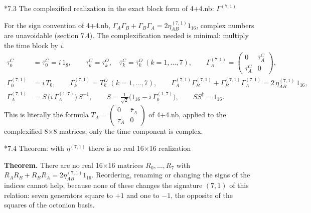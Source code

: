 \documentclass[10pt,a4paper]{article}
\makeatletter
\renewcommand\subsection{\@startsection{subsection}{2}{\z@}{-3.25ex\@plus -1ex \@minus -.2ex}{1.5ex \@plus .2ex}{\normalfont\large\bfseries\raggedright}}
\makeatother
\begin{document}
\subsection*{7.3 The complexified realization in the exact block form of 4+4.nb: \texorpdfstring{$\Gamma^{(7,1)}$}{Γ(7,1)}}
For the sign convention of 4+4.nb, $\Gamma_A\Gamma_B+\Gamma_B\Gamma_A=2\eta^{(7,1)}_{AB}1_{16}$, complex numbers are unavoidable (section 7.4). The complexification needed is minimal: multiply the time block by $i$.
\begin{align*}
\tau^{C}_0&=\bar\tau^{C}_0=i\,1_8,\qquad \tau^{C}_k=\tau^{O}_k,\quad \bar\tau^{C}_k=\bar\tau^{O}_k\ (k=1,\dots,7),\qquad \Gamma^{(7,1)}_A=\begin{pmatrix}0&\bar\tau^{C}_A\\ \tau^{C}_A&0\end{pmatrix}, \\
\Gamma^{(7,1)}_0&=i\,T_0,\qquad \Gamma^{(7,1)}_k=T^{O}_k\ (k=1,\dots,7),\qquad \Gamma^{(7,1)}_A\Gamma^{(7,1)}_B+\Gamma^{(7,1)}_B\Gamma^{(7,1)}_A=2\,\eta^{(7,1)}_{AB}\,1_{16}, \\
\Gamma^{(7,1)}_A&=S\,\big(i\,\Gamma^{(1,7)}_A\big)\,S^{-1},\qquad S=\tfrac{1}{\sqrt2}\big(1_{16}-i\,\Gamma^{(1,7)}_0\big),\qquad SS^{\dagger}=1_{16}.
\end{align*}
This is literally the formula $T_A=\left(\begin{smallmatrix}0&\bar\tau_A\\\tau_A&0\end{smallmatrix}\right)$ of 4+4.nb, applied to the complexified 8×8 matrices; only the time component is complex.

\subsection*{7.4 Theorem: with \texorpdfstring{$\eta^{(7,1)}$}{η(7,1)} there is no real 16×16 realization}
\textbf{Theorem.} There are no real 16×16 matrices $R_0,\dots,R_7$ with $R_AR_B+R_BR_A=2\eta^{(7,1)}_{AB}1_{16}$. Reordering, renaming or changing the signs of the indices cannot help, because none of these changes the signature $(7,1)$ of this relation: seven generators square to $+1$ and one to $-1$, the opposite of the squares of the octonion basis.
\end{document}
